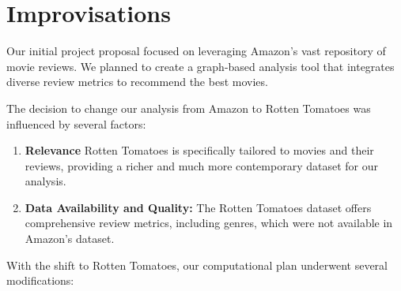 \documentclass[fontsize=11pt]{article}
\begin{document}
\section*{Improvisations}

Our initial project proposal focused on leveraging Amazon's vast repository of movie reviews. We planned to create a graph-based analysis tool that integrates diverse review metrics to recommend the best movies.
\vspace{0.5cm}

\noindent The decision to change our analysis from Amazon to Rotten Tomatoes was influenced by several factors:

\begin{enumerate}
    \item \textbf{Relevance} Rotten Tomatoes is specifically tailored to movies and their reviews, providing a richer and much more contemporary dataset for our analysis.
    \item \textbf{Data Availability and Quality:} The Rotten Tomatoes dataset offers comprehensive review metrics, including genres, which were not available in Amazon's dataset.
\end{enumerate}
\vspace{0.5cm}

\noindent With the shift to Rotten Tomatoes, our computational plan underwent several modifications:
\end{document}

